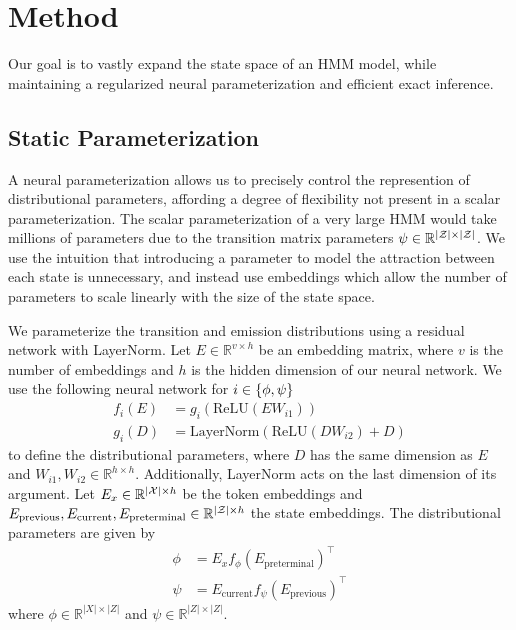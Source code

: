 \documentclass[11pt,a4paper]{article}
\begin{document}
\section{Method}

Our goal is to vastly expand the state space of an HMM model, while maintaining 
a regularized neural parameterization and efficient exact inference. 

\subsection{Static Parameterization}
A neural parameterization allows us to precisely control the
represention of distributional parameters,
affording a degree of flexibility not present in a scalar parameterization.
The scalar parameterization of a very large HMM would take millions of parameters
due to the transition matrix parameters $\psi \in \mathbb{R}^{|\mathcal{Z}|\times|\mathcal{Z}|}$.
We use the intuition that introducing a parameter to model the attraction
between each state is unnecessary,
and instead use embeddings which allow the number of parameters to
scale linearly with the size of the state space.

We parameterize the transition and emission distributions using a residual network
with LayerNorm.
Let $E\in\mathbb{R}^{v \times h}$ be an embedding matrix,
where $v$ is the number of embeddings and
$h$ is the hidden dimension of our neural network.
We use the following neural network for $i \in \left\{\phi,\psi\right\}$
\begin{equation}
\label{eqn:res}
\begin{aligned}
f_i(E) &= g_i(\textrm{ReLU}(EW_{i1}))\\
g_i(D) &= \textrm{LayerNorm}(\textrm{ReLU}(DW_{i2}) + D)
\end{aligned}
\end{equation}
to define the distributional parameters,
where $D$ has the same dimension as $E$
and $W_{i1},W_{i2} \in \mathbb{R}^{h \times h}$.
Additionally, LayerNorm acts on the last dimension of its argument.
Let $E_x \in \mathbb{R}^{|\mathcal{X}|\times h}$ be the token embeddings
and $E_{\textrm{previous}},E_{\textrm{current}},E_\textrm{preterminal}
\in \mathbb{R}^{|\mathcal{Z}|\times h}$ the state embeddings.
The distributional parameters are given by
\begin{equation}
\begin{aligned}
\phi &= E_x f_\phi(E_\textrm{preterminal})^\top\\
\psi &= E_\textrm{current} f_\psi(E_\textrm{previous})^\top
\end{aligned}
\end{equation}
where $\phi \in \mathbb{R}^{|X|\times|Z|}$ and $\psi \in \mathbb{R}^{|Z|\times|Z|}$.
\end{document}
